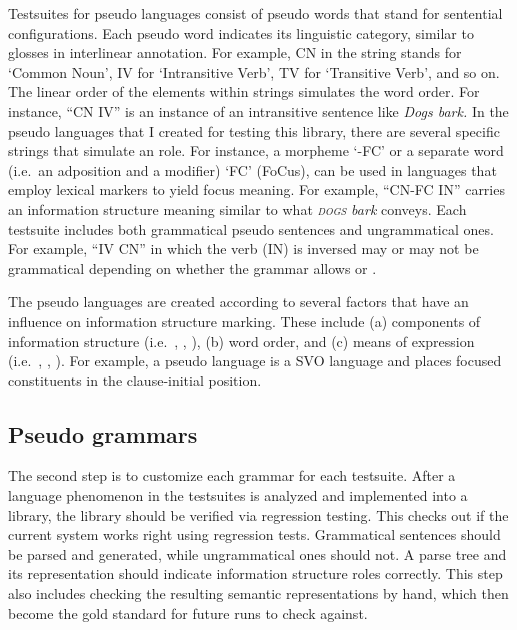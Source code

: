Testsuites for pseudo languages consist of pseudo words that stand for
sentential configurations. Each pseudo word indicates its linguistic
category, similar to glosses in interlinear annotation. For example,
CN in the string stands for `Common Noun', IV for `Intransitive Verb',
TV for `Transitive Verb', and so on. The linear order of the elements
within strings simulates the word order. For instance, ``CN IV'' is an
instance of an intransitive sentence like \textit{Dogs bark.}  In the
pseudo languages that I created for testing this library, there are
several specific strings that simulate an 
role. For instance, a morpheme `-FC' or a separate word
(i.e.\ an adposition and a modifier) `FC' (FoCus), can be used in
languages that employ lexical markers to yield focus meaning. For
example, ``CN-FC IN'' carries an information structure meaning similar
to what \textit{\textsc{dogs} bark} conveys.  Each testsuite includes
both grammatical pseudo sentences and ungrammatical ones. For example,
``IV CN'' in which the verb (IN) is inversed may or may not be
grammatical depending on whether the grammar allows 
or  .


The pseudo languages are created according to several factors that
have an influence on information structure marking. These include (a)
components of information structure
(i.e.\ , , ),
(b) word order, and (c) means of expression (i.e.\ , 
, ).
For example, a pseudo language
 is a SVO language and places focused
constituents in the clause-initial position.




\subsection{Pseudo grammars}
\label{13:ssec:grammars}


The second step is to customize each grammar for each
testsuite. After a language phenomenon in the
testsuites is analyzed and implemented into a library, the library
should be verified via regression testing.  This checks out if the
current system works right using regression tests. Grammatical
sentences should be parsed and generated, while ungrammatical ones
should not.  A parse tree and its 
 representation should indicate
information structure roles correctly.  This step also includes
checking the resulting semantic representations by hand, which then
become the gold standard for future runs to check
against.




